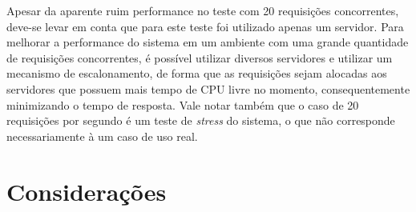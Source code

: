 Apesar da aparente ruim performance no teste com 20 requisições concorrentes, deve-se levar em conta que para este teste foi utilizado apenas um servidor.
Para melhorar a performance do sistema em um ambiente com uma grande quantidade de requisições concorrentes, é possível utilizar diversos servidores e utilizar um mecanismo de escalonamento, de forma que as requisições sejam alocadas aos servidores que possuem mais tempo de CPU livre no momento, consequentemente minimizando o tempo de resposta.
Vale notar também que o caso de 20 requisições por segundo é um teste de \emph{stress} do sistema, o que não corresponde necessariamente à um caso de uso real.

\section{Considerações}

